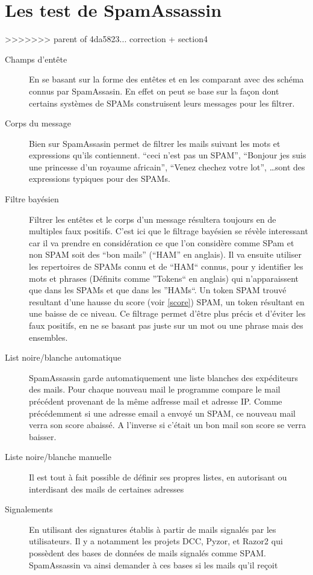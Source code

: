 \documentclass[a4paper,11pt]{article}
\begin{document}
\section{Les test de SpamAssassin }
>>>>>>> parent of 4da5823... correction + section4
\begin{description}
 \item [Champs d'entête] En se basant sur la forme des entêtes et en les comparant avec des schéma connus par SpamAssasin. En effet 
 on peut se base sur la façon dont certains systèmes de SPAMs construisent leurs messages pour les filtrer. 
 \item [Corps du message] Bien sur SpamAssasin permet de filtrer les mails suivant les mots et expressions qu'ils contiennent. 
 ``ceci n'est pas un SPAM'', ``Bonjour jes suis une princesse d'un royaume africain'', ``Venez chechez votre lot'', \dots sont des expressions
 typiques pour des SPAMs. 
 \item [Filtre bayésien] Filtrer les entêtes et le corps d'un message résultera toujours en de multiples faux positifs. C'est ici que le filtrage 
 bayésien se révèle interessant car il va prendre en considération ce que l'on considère comme SPam et non SPAM soit des ``bon mails'' (``HAM'' en anglais).
 Il va ensuite utiliser les repertoires de SPAMs connu et de ``HAM``  connus, pour y identifier les mots et phrases (Définits comme ''Tokens`` en anglais)
 qui n'apparaissent que dans les SPAMs et que dans les ''HAMs``.
 Un token SPAM trouvé resultant d'une hausse du score (voir \ref{score}) SPAM, un token résultant en une baisse de ce niveau. Ce filtrage permet d'être plus précis et d'éviter les faux positifs, 
 en ne se basant pas juste sur un mot ou une phrase mais des ensembles. 
 \item [List noire/blanche automatique] SpamAssassin garde automatiquement une liste blanches des expéditeurs des mails.
 Pour chaque nouveau mail le programme compare le mail précédent provenant de la même adfresse mail et adresse IP.
 Comme précédemment si une adresse email a envoyé un SPAM, ce nouveau mail verra son score abaissé. A l'inverse si c'était un bon mail son score 
 se verra baisser.
 \item [Liste noire/blanche manuelle] Il est tout à fait possible de définir ses propres listes, en autorisant ou 
 interdisant des mails de certaines adresses
 \item [Signalements] En utilisant des signatures établis à partir de mails signalés par les utilisateurs. Il y a notamment les projets DCC, Pyzor, et Razor2
 qui possèdent des bases de données de mails signalés comme SPAM. SpamAssassin va ainsi demander à ces bases si les mails qu'il reçoit 

\end{description}
\end{document}
